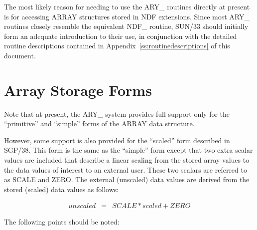 \documentclass[twoside,11pt]{article}
\newcommand{\xref}[3]{#1}
\newcommand{\xlabel}[1]{}
\begin{document}
The most likely reason for needing to use the ARY\_ routines directly at
present is for accessing ARRAY structures stored in NDF extensions.
Since most ARY\_ routines closely resemble the equivalent NDF\_ routine,
\xref{SUN/33}{sun33}{} should initially form an adequate introduction to 
their use, in conjunction with the detailed routine descriptions contained in 
Appendix~\ref{ss:routinedescriptions} of this document. 



\section{\xlabel{array_storage_forms}Array Storage Forms}
\label{array_storage_forms}

Note that at present, the ARY\_ system provides full support only for the 
``primitive'' and ``simple'' forms of the ARRAY data structure. 

However, some support is also provided for the ``scaled'' form described
in SGP/38. This form is the same as the ``simple'' form except that two
extra scalar values are included that describe a linear scaling from the
stored array values to the data values of interest to an external user.
These two scalars are referred to as SCALE and ZERO. The external
(unscaled) data values are derived from the stored (scaled) data values
as follows:

\begin{eqnarray*}
 unscaled & = & SCALE*scaled + ZERO
\end{eqnarray*}

The following points should be noted:
\end{document}
